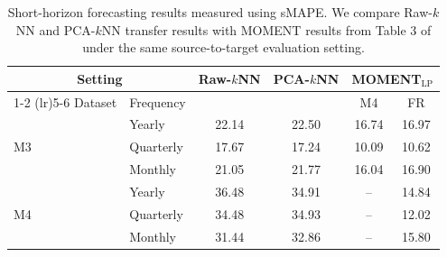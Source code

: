 \documentclass[12pt]{article}
\theoremstyle{definition}
\begin{document}

\begin{table}
  \caption{Short-horizon forecasting results measured using sMAPE. We compare Raw-$k$NN and PCA-$k$NN transfer results with MOMENT results from Table 3 of \cite{goswami2024moment} under the same source-to-target evaluation setting.}
  \label{tab:short_horizon_results_transfer}
  \centering
  \small
  \begin{tabular}{@{}llcccc@{}}
    \toprule
    \multicolumn{2}{c}{Setting} &
    \multirow{2}{*}{Raw-$k$NN} &
    \multirow{2}{*}{PCA-$k$NN} &
    \multicolumn{2}{c}{MOMENT$_{\mathrm{LP}}$} \\
    \cmidrule(lr){1-2}
    \cmidrule(lr){5-6}
    Dataset & Frequency & & & M4 & FR \\
    \midrule
    \multirow{3}{*}{M3}
      & Yearly    & 22.14 & 22.50 & 16.74 & 16.97 \\
      & Quarterly & 17.67 & 17.24 & 10.09 & 10.62 \\
      & Monthly   & 21.05 & 21.77 & 16.04 & 16.90 \\
    \midrule
    \multirow{3}{*}{M4}
      & Yearly    & 36.48 & 34.91 & --    & 14.84 \\
      & Quarterly & 34.48 & 34.93 & --    & 12.02 \\
      & Monthly   & 31.44 & 32.86 & --    & 15.80 \\
    \bottomrule
  \end{tabular}
\end{table}
\end{document}
